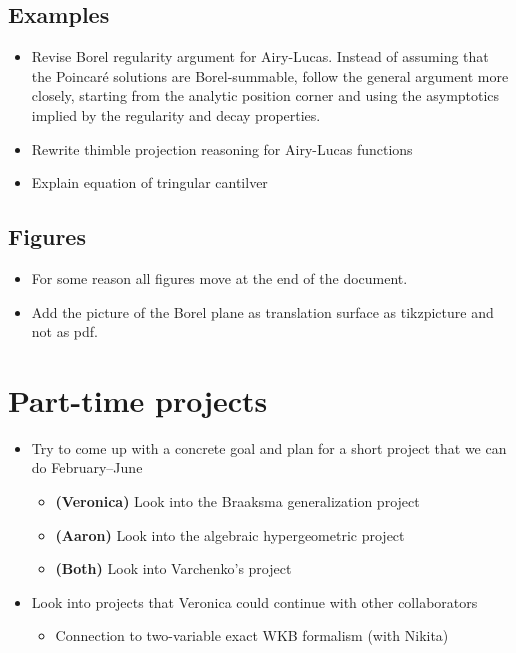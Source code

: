 \documentclass{article}
\begin{document}
\subsection{Examples}
\begin{itemize}
\item Revise Borel regularity argument for Airy-Lucas. Instead of assuming that the Poincar\'{e} solutions are Borel-summable, follow the general argument more closely, starting from the analytic position corner and using the asymptotics implied by the regularity and decay properties.
\item Rewrite thimble projection reasoning for Airy-Lucas functions
\item Explain equation of tringular cantilver
\end{itemize}
\subsection{Figures}
\begin{itemize}
\item For some reason all figures move at the end of the document.
\item Add the picture of the Borel plane as translation surface as tikzpicture and not as pdf.
\end{itemize}
\section{Part-time projects}
\begin{itemize}
\item Try to come up with a concrete goal and plan for a short project that we can do February--June
\begin{itemize}
\item \textbf{(Veronica)} Look into the Braaksma generalization project
\item \textbf{(Aaron)} Look into the algebraic hypergeometric project
\item \textbf{(Both)} Look into Varchenko's project
\end{itemize}
\item Look into projects that Veronica could continue with other collaborators
\begin{itemize}
\item Connection to two-variable exact WKB formalism (with Nikita)
\end{itemize}
\end{itemize}
\end{document}
